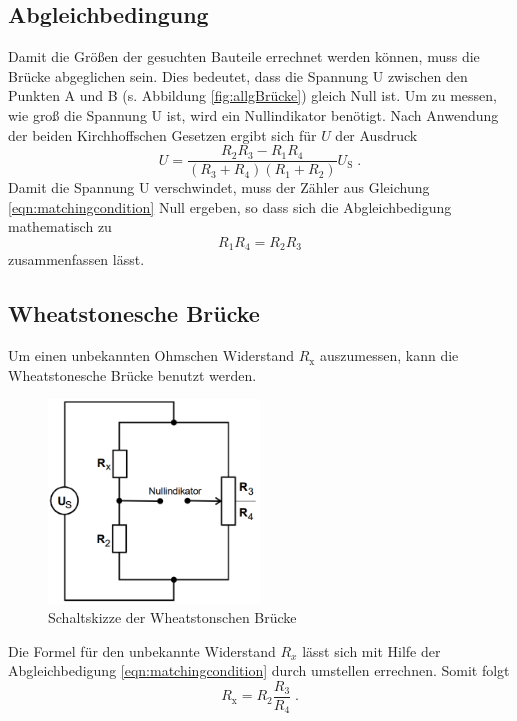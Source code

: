 \subsection{Abgleichbedingung}
Damit die Größen der gesuchten Bauteile errechnet werden können, muss die Brücke abgeglichen sein. Dies bedeutet, dass die Spannung U zwischen den Punkten A und B (s. 
Abbildung \ref{fig:allgBrücke}) gleich Null ist. Um zu messen, wie groß die Spannung U ist, wird ein Nullindikator benötigt.
Nach Anwendung der beiden Kirchhoffschen Gesetzen ergibt sich für $U$ der Ausdruck  
\begin{equation}
    U = \frac{R_2 R_3 - R_1 R_4}{\left( R_3 + R_4 \right) \left( R_1 + R_2\right)} U_\text{S} \; \text{.} \label{eqn:matchingcondition}
\end{equation}
Damit die Spannung U verschwindet, muss der Zähler aus Gleichung \eqref{eqn:matchingcondition} Null ergeben, so dass sich die Abgleichbedigung mathematisch zu
\begin{equation}
    R_1 R_4 = R_2 R_3 \label{fig:matchingcondition}
\end{equation}
zusammenfassen lässt. 
\subsection{Wheatstonesche Brücke} \label{subsec:Wheat}
Um einen unbekannten Ohmschen Widerstand $R_\text{x}$ auszumessen, kann die Wheatstonesche Brücke benutzt werden. 
\begin{figure}
    \centering
    \caption{Schaltskizze der Wheatstonschen Brücke}
    \label{fig:Wheatstone}
    \includegraphics[width = 0.5\textwidth]{bridges/wheat.png}
\end{figure}
Die Formel für den unbekannte Widerstand $R_x$ lässt sich mit Hilfe der Abgleichbedigung \eqref{eqn:matchingcondition} durch umstellen errechnen. Somit folgt 
\begin{equation}
    R_\text{x} = R_2 \frac{R_3}{R_4} \; \text{.} \label{eqn:wheat}
\end{equation}
